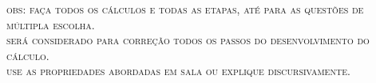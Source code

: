 \documentclass[10pt]{article}
\begin{document}


	\begin{center}
		\textsc{obs: faça todos os cálculos e todas as etapas, até para as questões de múltipla escolha. \\ será considerado para correção todos os passos do desenvolvimento do cálculo. \\ use as propriedades abordadas em sala ou explique discursivamente.}    
	\end{center}


	\begin{multicols}{2}
	\setlength\columnseprule{1pt} %
	
		
		
		
		
		
		
		
		
		
	
	\end{multicols}
\end{document}
